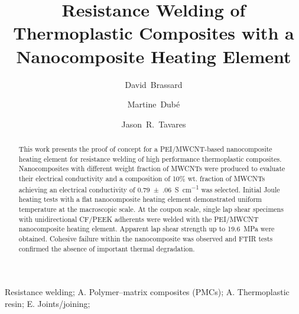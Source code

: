 \documentclass[11pt,review,times]{elsarticle}
\begin{document}


\title{Resistance Welding of Thermoplastic Composites with a Nanocomposite Heating Element}

\author[polymtl,crepec]{David~Brassard}
\author[ets,crepec]{Martine~Dubé}
\author[polymtl,crepec]{Jason~R.~Tavares}


\address[polymtl]{Department of Chemical Engineering, Polytechnique Montréal, P.O. Box 6079 Station Centre-Ville, Montréal, QC, H3C 3A7, Canada}
\address[ets]{Department of Mechanical Engineering, École de technologie supérieure, 1100 Notre-Dame Street West, Montréal, Québec, Canada, H3C 1K3}
\address[crepec]{Research Center for High Performance Polymer and Composite Systems (CREPEC), Polytechnique Montréal, P.O. Box 6079 Station Centre-Ville, Montréal, QC, H3C 3A7, Canada}

\begin{abstract}

This work presents the proof of concept for a PEI/MWCNT-based nanocomposite heating element for resistance welding of high performance thermoplastic composites. 
Nanocomposites with different weight fraction of MWCNTs were produced to evaluate their electrical conductivity and a composition of 10\% wt. fraction of MWCNTs achieving an electrical conductivity of \SI[multi-part-units = single]{0.79(06)}{\siemens\per\cm} was selected. 
Initial Joule heating tests with a flat nanocomposite heating element demonstrated uniform temperature at the macroscopic scale. 
At the coupon scale, single lap shear specimens with unidirectional CF/PEEK adherents were welded with the PEI/MWCNT nanocomposite heating element. 
Apparent lap shear strength up to \SI{19.6}{\mega\pascal} were obtained. 
Cohesive failure within the nanocomposite was observed and FTIR tests confirmed the absence of important thermal degradation. 

\end{abstract}

\begin{keyword}
Resistance welding;  A. Polymer–matrix composites (PMCs);  A. Thermoplastic resin;  E. Joints/joining;  
\end{keyword}

\maketitle
\end{document}
